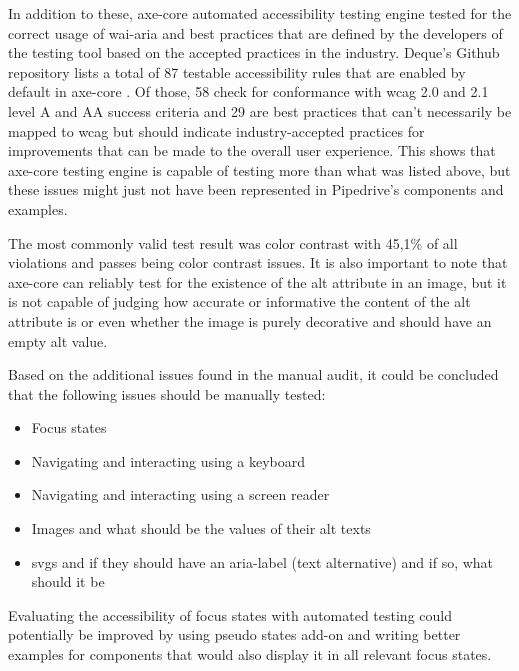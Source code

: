 \documentclass{master_thesis}
\begin{document}
In addition to these, axe-core automated accessibility testing engine tested for the correct usage of \ac{wai-aria} and best practices that are defined by the developers of the testing tool based on the accepted practices in the industry. Deque's Github repository lists a total of 87 testable accessibility rules that are enabled by default in axe-core \citep{Fiers2023}. Of those, 58 check for conformance with \ac{wcag} 2.0 and 2.1 level A and AA success criteria and 29 are best practices that can't necessarily be mapped to \ac{wcag} but should indicate industry-accepted practices for improvements that can be made to the overall user experience. This shows that axe-core testing engine is capable of testing more than what was listed above, but these issues might just not have been represented in Pipedrive's components and examples.

The most commonly valid test result was color contrast with 45,1\% of all violations and passes being color contrast issues. It is also important to note that axe-core can reliably test for the existence of the alt attribute in an image, but it is not capable of judging how accurate or informative the content of the alt attribute is or even whether the image is purely decorative and should have an empty alt value.

Based on the additional issues found in the manual audit, it could be concluded that the following issues should be manually tested:
\begin{itemize}
	\item Focus states
	\item Navigating and interacting using a keyboard
	\item Navigating and interacting using a screen reader
	\item Images and what should be the values of their alt texts
	\item \ac{svg}s and if they should have an aria-label (text alternative) and if so, what should it be
\end{itemize}

Evaluating the accessibility of focus states with automated testing could potentially be improved by using pseudo states add-on and writing better examples for components that would also display it in all relevant focus states.
\end{document}
